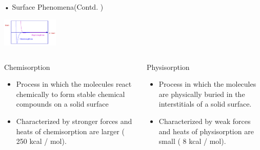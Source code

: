 \documentclass[11]{beamer}
\begin{document}
\begin{frame}{• Surface Phenomena(Contd. )}

   	\begin{center}
   			\includegraphics[width=0.2\textwidth]{PhsiChemiSorption.png}
  	 \end{center}
   
   
   \begin{columns}[t]
    
      
       \begin{exampleblock}{Chemisorption}
         \begin{itemize}
         	\item Process in which the molecules react chemically to form stable chemical compounds on a solid surface
			\item Characterized by stronger forces and heats of chemisorption are larger ( 250 kcal / mol).
		 \end{itemize}
       \end{exampleblock}
       
       \begin{exampleblock}{Physisorption}
         \begin{itemize}
           \item  Process in which the molecules are physically buried in the interstitials of a solid surface.
           \item  Characterized by weak forces and heats of physisorption are small ( 8 kcal / mol).
         \end{itemize}
      
       
       \end{exampleblock}   
   
    \end{columns}



\end{frame}
\end{document}
